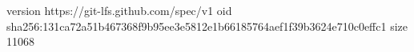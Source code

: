 version https://git-lfs.github.com/spec/v1
oid sha256:131ca72a51b467368f9b95ee3e5812e1b66185764aef1f39b3624e710c0effc1
size 11068
